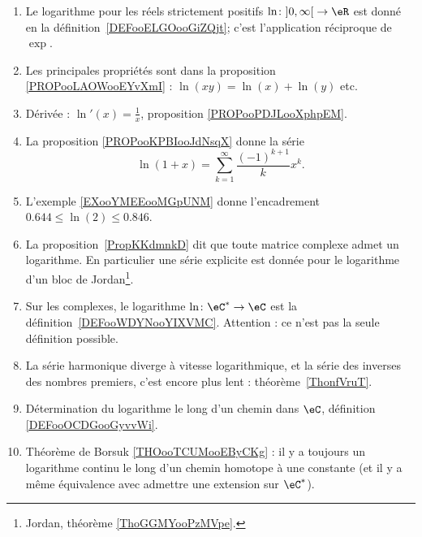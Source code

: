 
\begin{enumerate}
	\item
	      Le logarithme pour les réels strictement positifs \( \ln\colon \mathopen] 0 , \infty \mathclose[\to \eR\) est donné en la définition~\ref{DEFooELGOooGiZQjt}; c'est l'application réciproque de \( \exp\).
	\item
	      Les principales propriétés sont dans la proposition \ref{PROPooLAOWooEYvXmI} : \( \ln(xy)=\ln(x)+\ln(y)\) etc.
	\item
	      Dérivée : \( \ln'(x)=\frac{1}{ x }\), proposition \ref{PROPooPDJLooXphpEM}.
	\item
	      La proposition \ref{PROPooKPBIooJdNsqX} donne la série
	      \begin{equation}
		      \ln(1+x)=\sum_{k=1}^{\infty}\frac{ (-1)^{k+1} }{ k }x^k.
	      \end{equation}
	\item
	      L'exemple \ref{EXooYMEEooMGpUNM} donne l'encadrement \( 0.644\leq \ln(2)\leq 0.846\).
	\item
	      La proposition~\ref{PropKKdmnkD} dit que toute matrice complexe admet un logarithme. En particulier une série explicite est donnée pour le logarithme d'un bloc de Jordan\footnote{Jordan, théorème \ref{ThoGGMYooPzMVpe}.}.
	\item
	      Sur les complexes, le logarithme \( \ln \colon \eC^*\to \eC\) est la définition~\ref{DEFooWDYNooYIXVMC}. Attention : ce n'est pas la seule définition possible.
	\item
	      La série harmonique diverge à vitesse logarithmique, et la série des inverses des nombres premiers, c'est encore plus lent : théorème~\ref{ThonfVruT}.
      \item
          Détermination du logarithme le long d'un chemin dans \( \eC\), définition \ref{DEFooOCDGooGyvvWi}.
      \item
          Théorème de Borsuk \ref{THOooTCUMooEByCKg} : il y a toujours un logarithme continu le long d'un chemin homotope à une constante (et il y a même équivalence avec admettre une extension sur \( \eC^*\)).
\end{enumerate}

